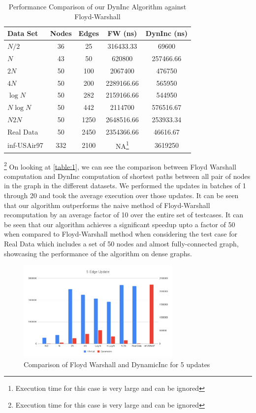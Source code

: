 \documentclass[conference]{IEEEtran}
\begin{document}
\begin{table}[htbp]
    \centering
    \caption{Performance Comparison of our DynInc Algorithm against Floyd-Warshall}
    \label{table:3}
    \begin{tabular}{|l|c|c|c|c|}
        \hline
        Data Set & Nodes & Edges & FW (ns) & DynInc (ns) \\
        \hline
        $N/2$ & 36 & 25 & 316433.33 & 69600 \\
        \hline
        $N$ & 43 & 50 & 620800 & 257466.66 \\
        \hline
        $2N$ & 50 & 100 & 2067400 & 476750 \\
        \hline
        $4N$ & 50 & 200 & 2289166.66 & 565950 \\
        \hline
        $\log N$ & 50 & 282 & 2159166.66 & 544950 \\
        \hline
        $N \log N$ & 50 & 442 & 2114700 & 576516.67 \\
        \hline
        $N 2N$ & 50 & 1250 & 2648516.66 & 253933.34 \\
        \hline
        Real Data & 50 & 2450 & 2354366.66 & 46616.67 \\
        \hline
        inf-USAir97 & 332 & 2100 & NA\footnote{Execution time for this case is very large and can be ignored} & 3619250 \\
        \hline      
    \end{tabular}
\end{table}
\footnote{Execution time for this case is very large and can be ignored}
On looking at \autoref{table:1}, we can see the comparison between Floyd Warshall computation and DynInc computation of shortest paths between all pair of nodes in the graph in the different datasets. We performed the updates in batches of 1 through 20 and took the average execution over those updates. It can be seen that our algorithm outperforms the naive method of Floyd-Warshall recomputation by an average factor of 10 over the entire set of testcases. It can be seen that our algorithm achieves a significant speedup upto a factor of 50 when compared to Floyd-Warshall method when considering the test case for Real Data which includes a set of 50 nodes and almost fully-connected graph, showcasing the performance of the algorithm on dense graphs.


\begin{figure}[htp]
    \centering
    \includegraphics[width=8cm]{figures/5EdgeUpdate.png}
    \caption{Comparison of Floyd Warshall and DynamicInc for 5 updates}
    \label{fig:5edgeupdate}
\end{figure}
\end{document}
